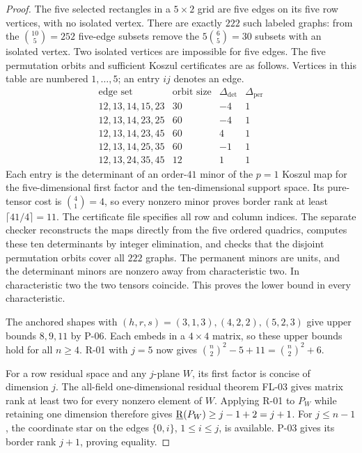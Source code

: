 \begin{proof}
The five selected rectangles in a $5\times2$ grid are
five edges on its five row vertices, with no isolated
vertex. There are exactly $222$ such labeled graphs:
from the $\binom{10}{5}=252$ five-edge subsets remove
the $5\binom65=30$ subsets with an isolated vertex.
Two isolated vertices are impossible for five edges.
The five permutation orbits and sufficient Koszul
certificates are as follows. Vertices in this table
are numbered $1,\ldots,5$; an entry $ij$ denotes an edge.
\[
\begin{array}{c|r|rr}
 \text{edge set}&\text{orbit size}&\Delta_{\det}&\Delta_{\mathrm{per}}\\ \hline
 12,13,14,15,23&30&-4&1\\
 12,13,14,23,25&60&-4&1\\
 12,13,14,23,45&60&4&1\\
 12,13,14,25,35&60&-1&1\\
 12,13,24,35,45&12&1&1
\end{array}
\]
Each entry is the determinant of an order-$41$ minor of
the $p=1$ Koszul map for the five-dimensional first
factor and the ten-dimensional support space. Its
pure-tensor cost is $\binom41=4$, so every nonzero
minor proves border rank at least
$\lceil41/4\rceil=11$. The certificate file
 specifies all row and
column indices. The separate checker
 reconstructs the maps
directly from the five ordered quadrics, computes these
ten determinants by integer elimination, and checks
that the disjoint permutation orbits cover all $222$
graphs. The permanent minors are units, and the
determinant minors are nonzero away from characteristic
two. In characteristic two the two tensors coincide.
This proves the lower bound in every characteristic.

The anchored shapes with $(h,r,s)=(3,1,3),(4,2,2),
(5,2,3)$ give upper bounds $8,9,11$ by P-06.
Each embeds in a $4\times4$ matrix, so these upper
bounds hold for all $n\geq4$. R-01 with $j=5$ now
gives $\binom n2^{2}-5+11=\binom n2^{2}+6$.

For a row residual space and any $j$-plane $W$, its
first factor is concise of dimension $j$. The all-field
one-dimensional residual theorem FL-03 gives matrix
rank at least two for every nonzero element of $W$.
Applying R-01 to $P_W$ while retaining one dimension
therefore gives $\underline{\mathrm R}(P_W)\geq j-1+2=j+1$.
For $j\leq n-1$, the coordinate star on the edges
$\{0,i\}$, $1\leq i\leq j$, is available. P-03 gives
its border rank $j+1$, proving equality.
\end{proof}

